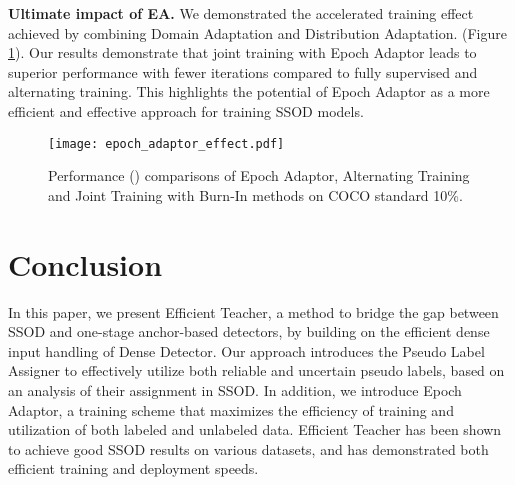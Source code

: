 \documentclass[10pt,twocolumn,letterpaper]{article}
\begin{document}
\textbf{Ultimate impact of EA.} We demonstrated the accelerated training effect achieved by combining Domain Adaptation and Distribution Adaptation. (Figure \ref{fig:epoch_adaptor}). Our results demonstrate that joint training with Epoch Adaptor leads to superior performance with fewer iterations compared to fully supervised and alternating training. This highlights the potential of Epoch Adaptor as a more efficient and effective approach for training SSOD models.
\begin{figure}[h]
    \centering \texttt{[image: epoch\_adaptor\_effect.pdf]}
    \caption{Performance () comparisons of Epoch Adaptor, Alternating Training and Joint Training with Burn-In methods on COCO standard 10\%.}
    \label{fig:epoch_adaptor}
\end{figure}
\section{Conclusion}
In this paper, we present Efficient Teacher, a method to bridge the gap between SSOD and one-stage anchor-based detectors, by building on the efficient dense input handling of Dense Detector. Our approach introduces the Pseudo Label Assigner to effectively utilize both reliable and uncertain pseudo labels, based on an analysis of their assignment in SSOD. In addition, we introduce Epoch Adaptor, a training scheme that maximizes the efficiency of training and utilization of both labeled and unlabeled data. Efficient Teacher has been shown to achieve good SSOD results on various datasets, and has demonstrated both efficient training and deployment speeds. 
{\small


}
\appendix
\end{document}

